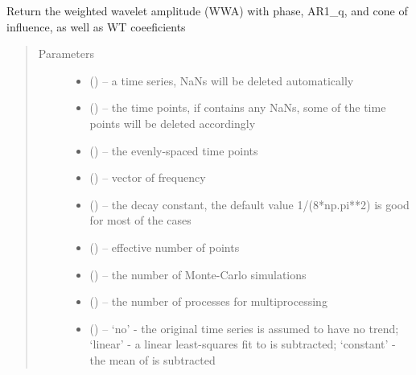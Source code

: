 \documentclass[letterpaper,10pt,english]{sphinxmanual}
\begin{document}
\begin{fulllineitems}
\label{\detokenize{Spectral:pyleoclim.Spectral.wwz}}
Return the weighted wavelet amplitude (WWA) with phase, AR1\_q, and cone of influence, as well as WT coeeficients
\begin{quote}\begin{description}
\item[{Parameters}] \leavevmode\begin{itemize}
\item {} 
 () -- a time series, NaNs will be deleted automatically

\item {} 
 () -- the time points, if  contains any NaNs, some of the time points will be deleted accordingly

\item {} 
 () -- the evenly-spaced time points

\item {} 
 () -- vector of frequency

\item {} 
 () -- the decay constant, the default value 1/(8*np.pi**2) is good for most of the cases

\item {} 
 () -- effective number of points

\item {} 
 () -- the number of Monte-Carlo simulations

\item {} 
 () -- the number of processes for multiprocessing

\item {} 
 () -- `no' - the original time series is assumed to have no trend;
`linear' - a linear least-squares fit to  is subtracted;
`constant' - the mean of  is subtracted


\end{itemize}
\end{description}
\end{quote}
\end{fulllineitems}
\end{document}
